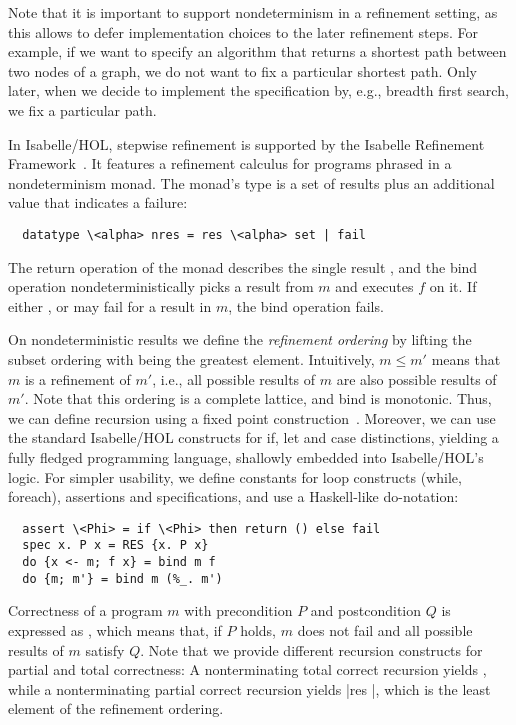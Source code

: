 \documentclass{llncs}
\begin{document}
Note that it is important to support nondeterminism in a refinement setting, as this allows to defer 
implementation choices to the later refinement steps. For example, if we want to specify an algorithm 
that returns a shortest path between two nodes of a graph, we do not want to fix a particular shortest path.
Only later, when we decide to implement the specification by, e.g., breadth first search, we fix a particular path.

In Isabelle/HOL, stepwise refinement is supported by the Isabelle Refinement Framework~\cite{LaTu12}. 
It features a refinement calculus for programs phrased in a nondeterminism monad. 
The monad's type is a set of results plus an additional value that indicates a failure:
\begin{lstlisting}
  datatype \<alpha> nres = res \<alpha> set | fail
\end{lstlisting}
The return operation  of the monad describes the single result , and the bind 
operation  nondeterministically picks a result from $m$ and executes $f$ on it. 
If either , or  may fail for a result in $m$, the bind operation fails.

On nondeterministic results we define the \emph{refinement ordering} by lifting the subset ordering with  being the greatest element.
Intuitively, $m\le m'$ means that $m$ is a refinement of $m'$, i.e., all possible results of $m$ are 
also possible results of $m'$. 
Note that this ordering is a complete lattice, and bind is monotonic. Thus, we can define recursion using a fixed point construction~\cite{Kr10}.
Moreover, we can use the standard Isabelle/HOL constructs for if, let and case distinctions, yielding a fully fledged programming 
language, shallowly embedded into Isabelle/HOL's logic. For simpler usability, we define constants for loop constructs (while, foreach), 
assertions and specifications, and use a Haskell-like do-notation:
\begin{lstlisting}
  assert \<Phi> = if \<Phi> then return () else fail
  spec x. P x = RES {x. P x}
  do {x <- m; f x} = bind m f
  do {m; m'} = bind m (%_. m')
\end{lstlisting}

Correctness of a program $m$ with precondition $P$ and postcondition $Q$ is expressed as , which
means that, if $P$ holds, $m$ does not fail and all possible results of $m$ satisfy $Q$. Note that we provide different recursion constructs
for partial and total correctness: A nonterminating total correct recursion yields , while a nonterminating partial correct 
recursion yields \isai|res {}|, which is the least element of the refinement ordering.
\end{document}
